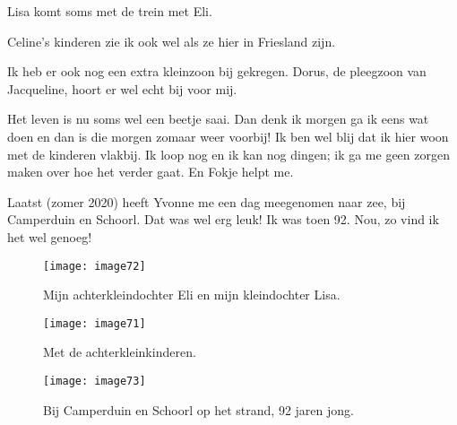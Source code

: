 Lisa komt soms met de trein met Eli. 

Celine’s kinderen zie ik ook wel als ze hier in Friesland zijn. 

Ik heb er ook nog een extra kleinzoon bij gekregen. Dorus, de pleegzoon van Jacqueline, hoort er wel echt bij voor mij.

Het leven is nu soms wel een beetje saai. Dan denk ik morgen ga ik eens wat doen en dan is die morgen zomaar weer voorbij! Ik ben wel blij dat ik hier woon met de kinderen vlakbij. Ik loop nog en ik kan nog dingen; ik ga me geen zorgen maken over hoe het verder gaat. En Fokje helpt me. 

Laatst (zomer 2020) heeft Yvonne me een dag meegenomen naar zee, bij Camperduin en Schoorl. Dat was wel erg leuk! Ik was toen 92. Nou, zo vind ik het wel genoeg!

\begin{figure}[h]
    \begin{centering}
    \texttt{[image: image72]}
    \caption{Mijn achterkleindochter Eli en mijn kleindochter Lisa.}
    \end{centering}
\end{figure}

\begin{figure}[h]
    \begin{centering}
    \texttt{[image: image71]}
    \caption{Met de achterkleinkinderen.}
    \end{centering}
\end{figure}

\newpage
\thispagestyle{empty}
\pagestyle{empty}

\begin{figure}[h]
    \begin{centering}
    \texttt{[image: image73]}
    \caption{Bij Camperduin en Schoorl op het strand, 92 jaren jong.}
    \end{centering}
\end{figure}